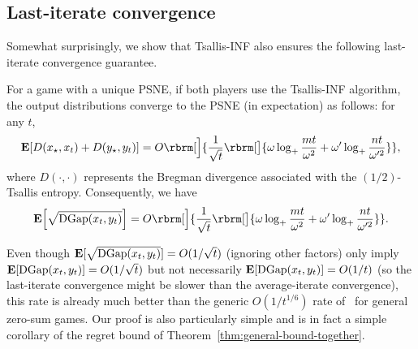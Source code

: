 \subsection{Last-iterate convergence}\label{sec:last-iterate}
Somewhat surprisingly, we show that Tsallis-INF also ensures 
the following last-iterate convergence guarantee.
\begin{proposition}
    \label{prop:last-iterate}
    For a game with a unique PSNE, if both players use the Tsallis-INF algorithm,
    the output distributions converge to the PSNE (in expectation) as follows: for any $t$,
    \begin{align}
        \E \sbr{
        D(x_{\star}, x_t)
        +
        D(y_{\star}, y_t)
        }
        =
        O \rbrm[\Big]{
            \frac{1}{\sqrt{t}}
            \rbrm[\big]{
                \omegar \log_{+}{
                    \frac{mt}{\omegar^2}
                }
                +
                \omegac \log_{+}{
                    \frac{nt}{\omegac^2}
                }
            }
        },
        \label{eq:li1}
    \end{align}
    where $D(\cdot, \cdot)$ represents the Bregman divergence associated with the $(1/2)$-Tsallis entropy.
    Consequently,
    we have
    \begin{align}
        \E \sbr{
            \sqrt{
                \DG \rbr{
                    x_t,
                    y_t
                }
            }
        }
        =
        O \rbrm[\Big]{
            \frac{1}{\sqrt{t}}
            \rbrm[\big]{
                \omegar \log_{+}{
                    \frac{mt}{\omegar^2}
                }
                +
                \omegac \log_{+}{
                    \frac{nt}{\omegac^2}
                }
            }
        }.
        \label{eq:li2}
    \end{align}
\end{proposition}
Even though $\operatorname*{\mathbf{E}}[\sqrt{\operatorname{DGap}(x_t, y_t)}] = O(1/\sqrt{t})$ (ignoring other factors) only imply $\operatorname*{\mathbf{E}}[\operatorname{DGap}(x_t, y_t)] = O(1/\sqrt{t})$ but not necessarily $\operatorname*{\mathbf{E}}[\operatorname{DGap}(x_t, y_t)] = O(1/t)$ (so the last-iterate convergence might be slower than the average-iterate convergence),
this rate is already much better than the generic $O(1/t^{1/6})$ rate of~\citet{cai2023uncoupled} for general zero-sum games.
Our proof is also particularly simple and is in fact a simple corollary of the regret bound of Theorem~\ref{thm:general-bound-together}. \\

